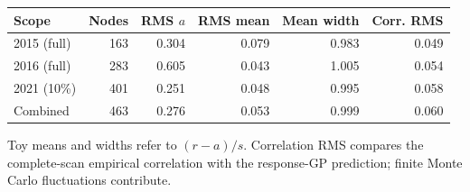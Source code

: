 \begin{center}\small\begin{tabular}{lrrrrr}\toprule
Scope & Nodes & RMS $a$ & RMS mean & Mean width & Corr. RMS\\\midrule
2015 (full) & 163 & 0.304 & 0.079 & 0.983 & 0.049\\
2016 (full) & 283 & 0.605 & 0.043 & 1.005 & 0.054\\
2021 (10\%) & 401 & 0.251 & 0.048 & 0.995 & 0.058\\
Combined & 463 & 0.276 & 0.053 & 0.999 & 0.060\\
\bottomrule\end{tabular}\end{center}
Toy means and widths refer to $(r-a)/s$. Correlation RMS compares the complete-scan empirical correlation with the response-GP prediction; finite Monte Carlo fluctuations contribute.
